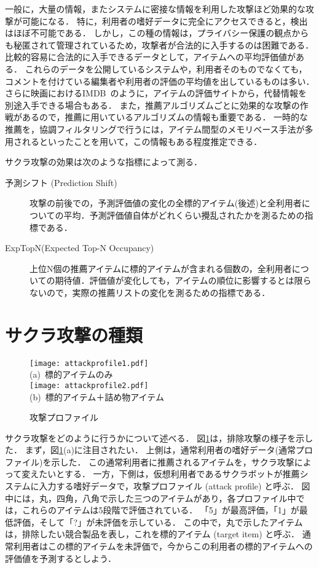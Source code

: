 一般に，大量の情報，またシステムに密接な情報を利用した攻撃ほど効果的な攻撃が可能になる．
特に，利用者の嗜好データに完全にアクセスできると，検出はほぼ不可能である．
しかし，この種の情報は，プライバシー保護の観点からも秘匿されて管理されているため，攻撃者が合法的に入手するのは困難である．
比較的容易に合法的に入手できるデータとして，アイテムへの平均評価値がある．
これらのデータを公開しているシステムや，利用者そのものでなくても，コメントを付けている編集者や利用者の評価の平均値を出しているものは多い．
さらに映画におけるIMDB~\cite{url:021}のように，アイテムの評価サイトから，代替情報を別途入手できる場合もある．
また，推薦アルゴリズムごとに効果的な攻撃の作戦があるので，推薦に用いているアルゴリズムの情報も重要である．
一時的な推薦を，協調フィルタリングで行うには，アイテム間型のメモリベース手法が多用されるといったことを用いて，この情報もある程度推定できる．

サクラ攻撃の効果は次のような指標によって測る．
\begin{description}
\item[予測シフト (Prediction Shift)] 攻撃の前後での，予測評価値の変化の全標的アイテム(後述)と全利用者についての平均．予測評価値自体がどれくらい攪乱されたかを測るための指標である．
\item[ExpTopN(Expected Top-N Occupancy)] 上位N個の推薦アイテムに標的アイテムが含まれる個数の，全利用者についての期待値．評価値が変化しても，アイテムの順位に影響するとは限らないので，実際の推薦リストの変化を測るための指標である．
\end{description}

\section{サクラ攻撃の種類}
\label{sec:shilling:tactics}

\begin{figure}
\centering
\texttt{[image: attackprofile1.pdf]}\\
(a)~標的アイテムのみ\\
\bigskip
\texttt{[image: attackprofile2.pdf]}\\
(b)~標的アイテム＋詰め物アイテム
\caption{攻撃プロファイル}
\label{fig:attackprofile}
\end{figure}

サクラ攻撃をどのように行うかについて述べる\cite{www:04:01}．
図\ref{fig:attackprofile}は，排除攻撃の様子を示した．
まず，図\ref{fig:attackprofile}(a)に注目されたい．
上側は，通常利用者の嗜好データ(通常プロファイル)を示した．
この通常利用者に推薦されるアイテムを，サクラ攻撃によって変えたいとする．
一方，下側は，仮想利用者であるサクラボットが推薦システムに入力する嗜好データで，攻撃プロファイル (attack profile) と呼ぶ．
図中には，丸，四角，八角で示した三つのアイテムがあり，各プロファイル中では，これらのアイテムは5段階で評価されている．
「5」が最高評価，「1」が最低評価，そして「?」が未評価を示している．
この中で，丸で示したアイテムは，排除したい競合製品を表し，これを標的アイテム (target item) と呼ぶ．
通常利用者はこの標的アイテムを未評価で，今からこの利用者の標的アイテムへの評価値を予測するとしよう．

